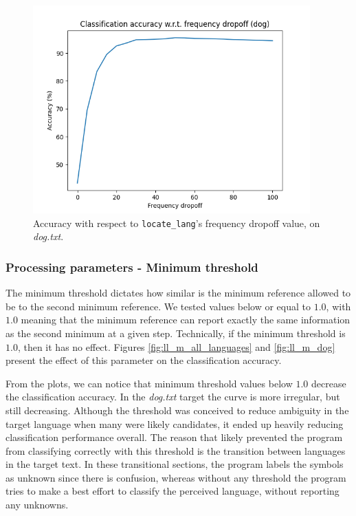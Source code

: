 \documentclass{article}
\begin{document}
\begin{figure}
    \centering
    \includegraphics[width=0.95\textwidth]{../results/dog/ll-f.png}
    \caption{Accuracy with respect to \texttt{locate\_lang}'s frequency dropoff value, on \textit{dog.txt}.}
    \label{fig:ll_f_dog}
\end{figure}

\subsubsection{Processing parameters - Minimum threshold}
\label{subsubsec:results_locate_lang_minimum_threshold}

The minimum threshold dictates how similar is the minimum reference allowed to be to the second minimum reference.
We tested values below or equal to $1.0$, with $1.0$ meaning that the minimum reference can report exactly the same information as the second minimum at a given step.
Technically, if the minimum threshold is $1.0$, then it has no effect.
Figures \ref{fig:ll_m_all_languages} and \ref{fig:ll_m_dog} present the effect of this parameter on the classification accuracy.

From the plots, we can notice that minimum threshold values below $1.0$ decrease the classification accuracy.
In the \textit{dog.txt} target the curve is more irregular, but still decreasing.
Although the threshold was conceived to reduce ambiguity in the target language when many were likely candidates, it ended up heavily reducing classification performance overall.
The reason that likely prevented the program from classifying correctly with this threshold is the transition between languages in the target text.
In these transitional sections, the program labels the symbols as unknown since there is confusion, whereas without any threshold the program tries to make a best effort to classify the perceived language, without reporting any unknowns.
\end{document}
